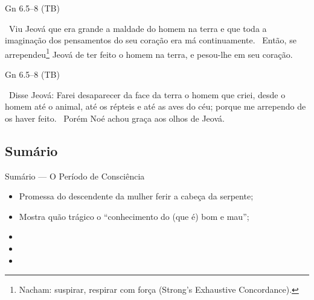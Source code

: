 \documentclass[12pt,aspectratio=169]{beamer}
\newcommand{\ver}[1]{%
    \raisebox{0.50ex}{%
        \scalebox{1.1}{%
            \pmb{\textbf{\textcolor{BSpbg}{#1}}}%
        }%
    }%
}
\newcommand{\QUOTE}[1]{%
    \par\noindent\hspace*{0.05\linewidth}%
    \begin{minipage}{0.9\linewidth}%
        \linespread{1.35}\large{#1}%
    \end{minipage}%
}
\newcommand{\RED}[1]{{\textcolor{TXred}{#1}}}
\newcommand{\YEL}[1]{{\textcolor{TXyel}{#1}}}
\newcommand{\GRE}[1]{{\textcolor{TXgre}{#1}}}
\newcommand{\MAG}[1]{{\textcolor{TXmag}{#1}}}
\newcommand{\BRI}[1]{{\textcolor{BSpbg}{#1}}}   %
\begin{document}
    \begin{frame}{Gn 6.5--8 (TB)}
        \QUOTE{%
            \ver{5}~Viu Jeová que era \RED{grande a maldade} do homem na terra e que \YEL{toda}
            a imaginação dos \RED{pensamentos} do seu coração era \RED{má} \YEL{continuamente}.
            \ver{6}~Então, se arrependeu\footnote{\YEL{Nacham}: \BRI{suspirar}, \BRI{respirar
            com força} (Strong's Exhaustive Concordance).} Jeová de ter feito o homem na terra,
            e pesou-lhe em seu coração.
        }
    \end{frame}

    \begin{frame}{Gn 6.5--8 (TB)}
        \QUOTE{%
            \ver{7}~Disse Jeová: Farei \RED{desaparecer da face da terra o homem que criei},
            desde o homem até o animal, até os répteis e até as aves do céu; porque me arrependo
            de os haver feito.
            \ver{8}~\GRE{Porém Noé achou graça aos olhos de Jeová}.
        }
    \end{frame}

    \subsection{Sumário}

    \begin{frame}
        \par\noindent\hspace*{0.05\linewidth}%
        \begin{minipage}{0.9\linewidth}%
            \large%
            \begin{alertblock}{Sumário --- O Período de Consciência}
                \normalsize
                \begin{itemize}
                    \item<1-> Promessa d\MAG{o descendente da mulher} ferir a cabeça da serpente;
                    \item<1-> Mostra quão trágico o ``\RED{conhecimento do (que é) bom e mau}'';
                    \item<1-> 
                    \item<1-> 
                    \item<1-> 
                \end{itemize}
            \end{alertblock}
        \end{minipage}%
    \end{frame}
\end{document}
